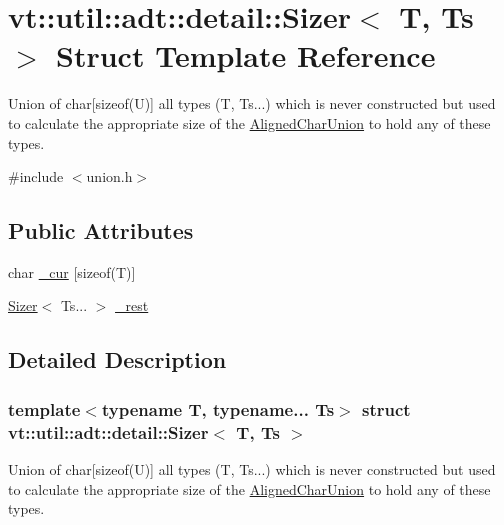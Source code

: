\hypertarget{unionvt_1_1util_1_1adt_1_1detail_1_1_sizer}{}\section{vt\+:\+:util\+:\+:adt\+:\+:detail\+:\+:Sizer$<$ T, Ts $>$ Struct Template Reference}
\label{unionvt_1_1util_1_1adt_1_1detail_1_1_sizer}


Union of char\mbox{[}sizeof(\+U)\mbox{]} all types (T, Ts...) which is never constructed but used to calculate the appropriate size of the {\ttfamily \hyperlink{structvt_1_1util_1_1adt_1_1_aligned_char_union}{Aligned\+Char\+Union}} to hold any of these types.  




{\ttfamily \#include $<$union.\+h$>$}

\subsection*{Public Attributes}
\begin{DoxyCompactItemize}
\item 
char \hyperlink{unionvt_1_1util_1_1adt_1_1detail_1_1_sizer_ab659dbf40d7aefdf14f206a1df10a441}{\+\_\+cur} \mbox{[}sizeof(T)\mbox{]}
\item 
\hyperlink{unionvt_1_1util_1_1adt_1_1detail_1_1_sizer}{Sizer}$<$ Ts... $>$ \hyperlink{unionvt_1_1util_1_1adt_1_1detail_1_1_sizer_a7e30375672bcb283804e3589c96ffccf}{\+\_\+rest}
\end{DoxyCompactItemize}


\subsection{Detailed Description}
\subsubsection*{template$<$typename T, typename... Ts$>$\newline
struct vt\+::util\+::adt\+::detail\+::\+Sizer$<$ T, Ts $>$}

Union of char\mbox{[}sizeof(\+U)\mbox{]} all types (T, Ts...) which is never constructed but used to calculate the appropriate size of the {\ttfamily \hyperlink{structvt_1_1util_1_1adt_1_1_aligned_char_union}{Aligned\+Char\+Union}} to hold any of these types. 



